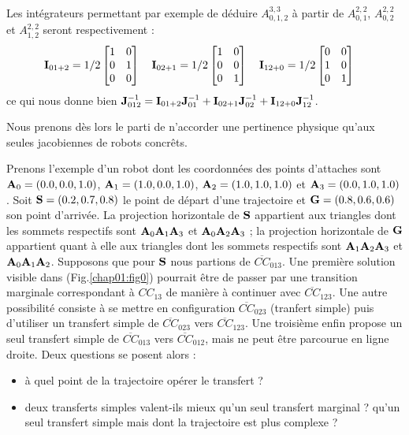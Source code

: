 Les int\'egrateurs permettant par exemple de d\'eduire $A^{3,3}_{0, 1, 2}$ \`a 
partir de $A^{2,2}_{0, 1}$, $A^{2,2}_{0, 2}$ et $A^{2,2}_{1,2}$ seront 
respectivement :
\begin{equation}
{\bf I}_{01+2} = 1/2
\begin{bmatrix}
1 & 0 \\
0 & 1 \\
0 & 0
\end{bmatrix}
\quad
{\bf I}_{02+1} = 1/2
\begin{bmatrix}
1 & 0 \\
0 & 0 \\
0 & 1
\end{bmatrix}
\quad
{\bf I}_{12+0} = 1/2
\begin{bmatrix}
0 & 0 \\
1 & 0 \\
0 & 1
\end{bmatrix}
\label{chap01:eq04} \quad
\end{equation}
ce qui nous donne bien ${\bf J}^{-1}_{012} = {\bf I}_{01+2} {\bf J}^{-1}_{01} + 
{\bf I}_{02+1} {\bf J}^{-1}_{02} + {\bf I}_{12+0} {\bf J}^{-1}_{12}$.

Nous prenons d\`es lors le parti de n'accorder une pertinence physique qu'aux 
seules jacobiennes de robots concr\^ets.

Prenons l'exemple d'un robot dont les coordonn\'ees des points d'attaches sont 
${\bf A}_0 = (0.0, 0.0, 1.0)$, ${\bf A}_1 = (1.0, 0.0, 1.0)$, ${\bf A}_2 = 
(1.0, 1.0, 1.0)$ et ${\bf A}_3 = (0.0, 1.0, 1.0)$. Soit ${\bf S} = (0.2, 0.7, 
0.8)$ le point de d\'epart d'une trajectoire et ${\bf G} = (0.8, 0.6, 0.6)$ son 
point d'arriv\'ee. La projection horizontale de ${\bf S}$ appartient aux 
triangles dont les sommets respectifs sont ${\bf A}_0{\bf A}_1{\bf A}_3$ et 
${\bf A}_0{\bf A}_2{\bf A}_3$ ; la projection horizontale de ${\bf G}$ 
appartient quant \`a elle aux triangles dont les sommets respectifs sont ${\bf 
A}_1{\bf A}_2{\bf A}_3$ et ${\bf A}_0{\bf A}_1{\bf A}_2$. Supposons que pour 
${\bf S}$ nous partions de $\overline{CC}_{013}$. Une premi\`ere solution 
visible  dans (Fig.\ref{chap01:fig0}) pourrait \^etre de passer par une 
transition marginale correspondant \`a $CC_{13}$ de mani\`ere \`a continuer 
avec $\overline{CC}_{123}$. Une autre possibilit\'e consiste \`a se mettre en 
configuration $\overline{CC}_{023}$ (tranfert simple) puis d'utiliser un 
transfert simple de $\overline{CC}_{023}$ vers $\overline{CC}_{123}$. Une 
troisi\`eme enfin propose un seul transfert simple de $\overline{CC}_{013}$ 
vers $\overline{CC}_{012}$, mais ne peut \^etre parcourue en ligne droite. Deux 
questions se posent alors :
\begin{itemize}
 \item \`a quel point de la trajectoire op\'erer le transfert ?
  \item  deux transferts simples valent-ils mieux qu'un seul transfert marginal 
? qu'un seul transfert simple mais dont la trajectoire est plus complexe ? 
\end{itemize}

